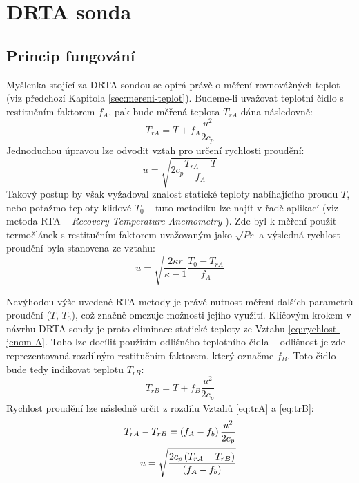 \section{DRTA sonda}
    \subsection{Princip fungování} \label{sec:DRTA-princip}
        Myšlenka stojící za DRTA sondou se opírá právě o měření rovnovážných teplot (viz předchozí Kapitola \ref{sec:mereni-teplot}). Budeme-li uvažovat teplotní čidlo s restitučním faktorem $f_A$, pak bude měřená teplota $T_{rA}$ dána následovně:
        \begin{equation} \label{eq:trA}
            T_{rA} = T + f_A \frac{u^2}{2 c_p}
        \end{equation}
        \noindent Jednoduchou úpravou lze odvodit vztah pro určení rychlosti proudění:
        \begin{equation} \label{eq:rychlost-jenom-A}
            u = \sqrt{2 c_p \frac{T_{rA} - T}{f_A}}
        \end{equation}
        Takový postup by však vyžadoval znalost statické teploty nabíhajícího proudu $T$, nebo potažmo teploty klidové $T_0$ – tuto metodiku lze najít v řadě aplikací (viz metoda RTA – \textit{Recovery Temperature Anemometry} \cite{Ishibashi2004, Ishibashi2012}). Zde byl k měření použit termočlánek s restitučním faktorem uvažovaným jako $\sqrt{Pr}$ a výsledná rychlost proudění byla stanovena ze vztahu:
        \begin{equation}
            u = \sqrt{\frac{2 \kappa r}{\kappa - 1} \frac{T_0 - T_{rA}}{f_A}}
        \end{equation}
        
        Nevýhodou výše uvedené RTA metody je právě nutnost měření dalších parametrů proudění ($T$, $T_0$), což značně omezuje možnosti jejího využití. Klíčovým krokem v návrhu DRTA sondy je proto eliminace statické teploty ze Vztahu \ref{eq:rychlost-jenom-A}. Toho lze docílit použitím odlišného teplotního čidla – odlišnost je zde reprezentovaná rozdílným restitučním faktorem, který označme $f_B$. Toto čidlo bude tedy indikovat teplotu $T_{rB}$:
        \begin{equation} \label{eq:trB}
            T_{rB} = T + f_B \frac{u^2}{2 c_p}
        \end{equation}
        \noindent Rychlost proudění lze následně určit z rozdílu Vztahů \ref{eq:trA} a \ref{eq:trB}:
        \begin{equation} \label{eq:mereni-rychlosti}
            \begin{split} 
                T_{rA} - T_{rB} = \left( f_A - f_b \right) \frac{u^2}{2 c_p} \\
                u = \sqrt{\frac{2 c_p \left( T_{rA} - T_{rB} \right)}{\left( f_A - f_b \right)}}
            \end{split}
        \end{equation}

